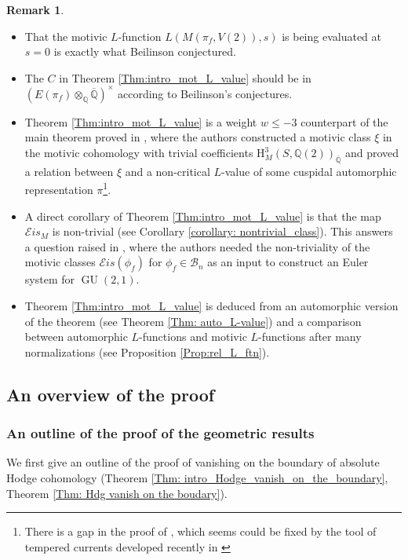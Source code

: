 \documentclass[11pt, a4paper]{amsart}
\theoremstyle{plain}
\theoremstyle{definition}
\newtheorem{remark}[theorem]{Remark}
\numberwithin{equation}{section}
\def\QQ{\mathbb{Q}}
\DeclareMathOperator{\GU}{GU}
\begin{document}
\begin{remark}
    \begin{itemize}
        \item That the motivic $L$-function $L(M(\pi_f, V(2)), s)$ is being evaluated at $s = 0$ is exactly what Beilinson conjectured. \cite[Conjecture (6.1)]{Nekovar94} 
        \item The $C$ in Theorem \ref{Thm:intro_mot_L_value} should be in $(E(\pi_f) \otimes_{\QQ} \overline{\QQ})^{\times}$ according to Beilinson's conjectures.
        \item Theorem \ref{Thm:intro_mot_L_value} is a weight $w \le -3$ counterpart of the main theorem proved in \cite{PS18}, where the authors constructed a motivic class $\xi$ in the motivic cohomology with trivial coefficients $\mathrm{H}_{M}^{3}(S, \QQ(2))_{\overline{\QQ}}$ and proved a relation between $\xi$ and a non-critical $L$-value of some cuspidal automorphic representation $\pi$\footnote{There is a gap in the proof of \cite{PS18}, which seems could be fixed by the tool of tempered currents developed recently in \cite{BCLRJ24}}. 
        \item A direct corollary of Theorem \ref{Thm:intro_mot_L_value}  is that the map $\mathcal{E}is_{M}$ is non-trivial (see Corollary \ref{corollary: nontrivial_class}). This answers a question raised in \cite{LSZ22}, where the authors needed the non-triviality of the motivic classes $\mathcal{E}is(\phi_f)$ for $\phi_f \in \mathcal{B}_{n}$ as an input to construct an Euler system for $\GU(2,1)$. 
        \item Theorem \ref{Thm:intro_mot_L_value} is deduced from an automorphic version of the theorem (see Theorem \ref{Thm: auto_L-value}) and a comparison between automorphic $L$-functions and motivic $L$-functions after many normalizations (see Proposition \ref{Prop:rel_L_ftn}). 
    \end{itemize}
\end{remark}

\subsection{An overview of the proof}

\subsubsection{An outline of the proof of the geometric results}

We first give an outline of the proof of vanishing on the boundary of absolute Hodge cohomology (Theorem \ref{Thm: intro_Hodge_vanish_on_the_boundary}, Theorem \ref{Thm: Hdg vanish on the boudary}). 
\end{document}
